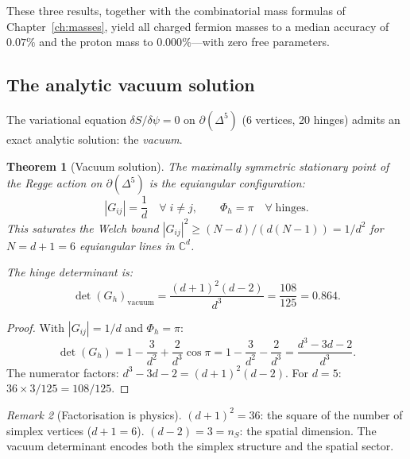 \documentclass[12pt]{article}
\newtheorem{theorem}{Theorem}[section]
\theoremstyle{remark}
\newtheorem{remark}[theorem]{Remark}
\theoremstyle{definition}
\newcommand{\CC}{\mathbb{C}}
\begin{document}
These three results, together with the combinatorial mass formulas of
Chapter~\ref{ch:masses}, yield all charged fermion masses to a median
accuracy of $0.07\%$ and the proton mass to $0.000\%$---with zero
free parameters.

\subsection{The analytic vacuum solution}
\label{sec:vacuum_solution}

The variational equation $\delta S/\delta\psi = 0$ on $\partial(\Delta^5)$ (6 vertices, 20 hinges) admits an exact analytic solution: the \emph{vacuum}.

\begin{theorem}[Vacuum solution]
\label{thm:vacuum}
The maximally symmetric stationary point of the Regge action on $\partial(\Delta^5)$ is the equiangular configuration:
\begin{equation}
|G_{ij}| = \frac{1}{d} \quad \forall\; i \ne j, \qquad \Phi_h = \pi \quad \forall\;\text{hinges}.
\end{equation}
This saturates the Welch bound $|G_{ij}|^2 \ge (N-d)/(d(N-1)) = 1/d^2$ for $N = d+1 = 6$ equiangular lines in $\CC^d$.

The hinge determinant is:
\begin{equation}
\boxed{\det(G_h)_{\mathrm{vacuum}} = \frac{(d+1)^2(d-2)}{d^3} = \frac{108}{125} = 0.864.}
\end{equation}
\end{theorem}

\begin{proof}
With $|G_{ij}| = 1/d$ and $\Phi_h = \pi$:
\begin{equation}
\det(G_h) = 1 - \frac{3}{d^2} + \frac{2}{d^3}\cos\pi = 1 - \frac{3}{d^2} - \frac{2}{d^3} = \frac{d^3 - 3d - 2}{d^3}.
\end{equation}
The numerator factors: $d^3 - 3d - 2 = (d+1)^2(d-2)$.  For $d = 5$: $36 \times 3 / 125 = 108/125$.
\end{proof}

\begin{remark}[Factorisation is physics]
$(d+1)^2 = 36$: the square of the number of simplex vertices ($d+1 = 6$).  $(d-2) = 3 = n_S$: the spatial dimension.  The vacuum determinant encodes both the simplex structure and the spatial sector.
\end{remark}
\end{document}
